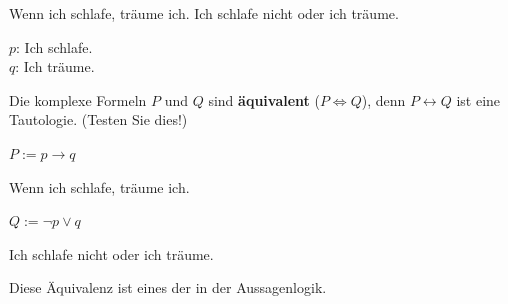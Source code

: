 \begin{frame}

\begin{exe}
	 Wenn ich schlafe, träume ich.
	 Ich schlafe nicht oder ich träume.
\end{exe}

{\small 
	$p$: Ich schlafe.\\
	$q$: Ich träume.
}

\pause 

\begin{minipage}{0.48\textwidth}
\centering

\end{minipage}
\pause
\begin{minipage}{0.48\textwidth}
\centering


\end{minipage}

\end{frame}


\begin{frame}

Die komplexe Formeln $P$ und $Q$ sind \textbf{äquivalent} ($P \Leftrightarrow Q$), denn $P \leftrightarrow Q$ ist eine Tautologie. (Testen Sie dies!)

\begin{exe}
	
	 $P := p \rightarrow q$
	
	Wenn ich schlafe, träume ich.
	
	 $Q := \lnot p \lor q$
	
	Ich schlafe nicht oder ich träume.
		
\end{exe}

Diese Äquivalenz ist eines der  in der Aussagenlogik.

\end{frame}


